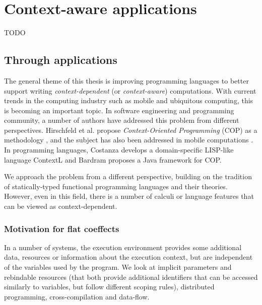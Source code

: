 \chapter{Context-aware applications} 
\label{ch:applications} 


TODO


\section{Through applications}
\label{sec:path-apps}

The general theme of this thesis is improving programming languages to better support writing
\emph{context-dependent} (or \emph{context-aware}) computations. With current trends in the 
computing industry such as mobile and ubiquitous computing, this is becoming an important topic.
In software engineering and programming community, a number of authors have addressed this problem
from different perspectives. Hirschfeld et al. propose \emph{Context-Oriented Programming} (COP)
as a methodology \cite{app-cop-method}, and the subject has also been addressed in mobile
computations \cite{app-cop-mobile,app-cop-mobile2}. In programming languages, Costanza 
\cite{app-cop-contextl} develops a domain-specific LISP-like language ContextL and Bardram 
\cite{app-cop-javafwk} proposes a Java framework for COP.

We approach the problem from a different perspective, building on the tradition of 
statically-typed functional programming languages and their theories. However, even in this field,
there is a number of calculi or language features that can be viewed as context-dependent.


\subsection{Motivation for flat coeffects}

In a number of systems, the execution environment provides some additional data, resources or 
information about the execution context, but are independent of the variables used by the 
program. We look at implicit parameters and rebindable resources (that both provide additional
identifiers that can be accessed similarly to variables, but follow different scoping rules),
distributed programming, cross-compilation and data-flow.


